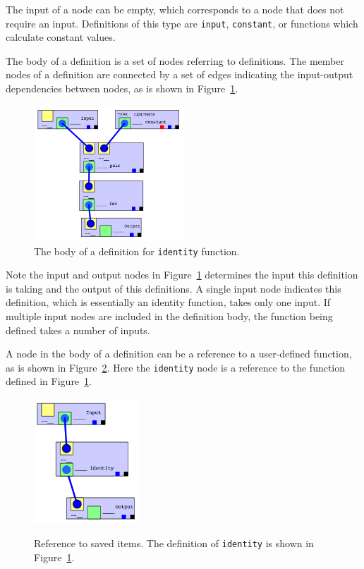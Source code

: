 \documentclass[12pt,UTF8,a4]{article}
\newcommand{\code}[1]{\texttt{#1}}
\begin{document}
The input of a node can be empty, which corresponds to a node that
does not require an input. Definitions of this type are \code{input},
\code{constant}, or functions which calculate constant values.

The body of a definition is a set of nodes referring to
definitions. The member nodes of a definition are connected by a set
of edges indicating the input-output dependencies between nodes, as is
shown in Figure~\ref{fig:defbody}.

\begin{figure}[!ht]
\center
\includegraphics[width=0.5\textwidth]{./images/defbody}
\caption{The body of a definition for \code{identity} function.}\label{fig:defbody}
\end{figure}

Note the input and output nodes in Figure~\ref{fig:defbody} determines
the input this definition is taking and the output of this
definitions. A single input node indicates this definition, which is
essentially an identity function, takes only one input. If multiple
input nodes are included in the definition body, the function being
defined takes a number of inputs.

A node in the body of a definition can be a reference to a
user-defined function, as is shown in Figure~\ref{fig:ref}. Here the
\code{identity} node is a reference to the function defined in
Figure~\ref{fig:defbody}.
\begin{figure}[!ht]
\center
\includegraphics[width=0.35\textwidth]{./images/ref} \\
\caption{Reference to saved items. The definition of \code{identity} is shown in Figure~\ref{fig:defbody}.}\label{fig:ref}
\end{figure}
\end{document}
